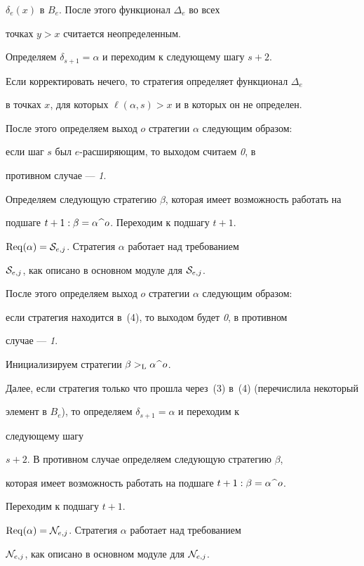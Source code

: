 $\delta_e(x)$ в $B_e$. После этого функционал $\Delta_e$ во всех


точках $y>x$ считается неопределенным.


Определяем $\delta_{s+1}=\alpha$ и переходим к следующему шагу $s+2$.


Если корректировать нечего, то стратегия определяет функционал $\Delta_e$


в точках $x$, для которых $\ell(\alpha,s)>x$ и в которых он не определен.


После этого определяем выход $o$ стратегии $\alpha$ следующим образом:


если шаг $s$ был $e$-расширяющим, то выходом считаем {\it 0}, в


противном случае --- {\it 1}.


Определяем следующую стратегию $\beta$, которая имеет возможность работать на


подшаге $t+1: \beta=\alpha\,\widehat{\ }\,o$. Переходим к подшагу $t+1$.


  


$\operatorname{Req}(\alpha)={\cal S}_{e,j}$. Стратегия $\alpha$ работает над требованием


${\cal S}_{e,j}$, как описано в основном модуле для  ${\cal S}_{e,j}$.


После этого определяем выход  $o$ стратегии $\alpha$ следующим образом:


если стратегия находится в~(4), то выходом будет {\it 0}, в противном


случае --- {\it 1}.


Инициализируем стратегии $\beta>_{\mathrm L}\alpha\,\widehat{\ }\,o$.


Далее, если стратегия только что прошла через~(3) в~(4) (перечислила некоторый


элемент в $B_e$), то определяем $\delta_{s+1}=\alpha$ и переходим к


следующему шагу


$s+2$. В противном случае определяем следующую стратегию $\beta$,


которая имеет возможность работать на подшаге $t+1 : \beta=\alpha\,\widehat{\ }\,o$.


Переходим к подшагу $t+1$.





$\operatorname{Req}(\alpha)={\cal N}_{e,j}$. Стратегия $\alpha$ работает над требованием


${\cal N}_{e,j}$, как описано в основном модуле для ${\cal N}_{e,j}$.


